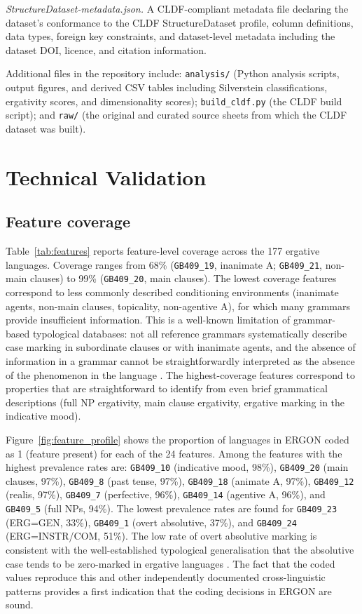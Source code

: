 \documentclass[12pt,a4paper]{article}
\newcommand{\feat}[1]{\texttt{#1}}
\begin{document}
\textit{StructureDataset-metadata.json.} A CLDF-compliant metadata file declaring the dataset's conformance to the CLDF StructureDataset profile, column definitions, data types, foreign key constraints, and dataset-level metadata including the dataset DOI, licence, and citation information.

Additional files in the repository include: \texttt{analysis/} (Python analysis scripts, output figures, and derived CSV tables including Silverstein classifications, ergativity scores, and dimensionality scores); \texttt{build\_cldf.py} (the CLDF build script); and \texttt{raw/} (the original and curated source sheets from which the CLDF dataset was built).

\section{Technical Validation}

\subsection{Feature coverage}

Table~\ref{tab:features} reports feature-level coverage across the 177 ergative languages. Coverage ranges from 68\% (\feat{GB409\_19}, inanimate A; \feat{GB409\_21}, non-main clauses) to 99\% (\feat{GB409\_20}, main clauses). The lowest coverage features correspond to less commonly described conditioning environments (inanimate agents, non-main clauses, topicality, non-agentive A), for which many grammars provide insufficient information. This is a well-known limitation of grammar-based typological databases: not all reference grammars systematically describe case marking in subordinate clauses or with inanimate agents, and the absence of information in a grammar cannot be straightforwardly interpreted as the absence of the phenomenon in the language \cite{grambank2023}. The highest-coverage features correspond to properties that are straightforward to identify from even brief grammatical descriptions (full NP ergativity, main clause ergativity, ergative marking in the indicative mood).

Figure~\ref{fig:feature_profile} shows the proportion of languages in ERGON coded as 1 (feature present) for each of the 24 features. Among the features with the highest prevalence rates are: \feat{GB409\_10} (indicative mood, 98\%), \feat{GB409\_20} (main clauses, 97\%), \feat{GB409\_8} (past tense, 97\%), \feat{GB409\_18} (animate A, 97\%), \feat{GB409\_12} (realis, 97\%), \feat{GB409\_7} (perfective, 96\%), \feat{GB409\_14} (agentive A, 96\%), and \feat{GB409\_5} (full NPs, 94\%). The lowest prevalence rates are found for \feat{GB409\_23} (ERG=GEN, 33\%), \feat{GB409\_1} (overt absolutive, 37\%), and \feat{GB409\_24} (ERG=INSTR/COM, 51\%). The low rate of overt absolutive marking is consistent with the well-established typological generalisation that the absolutive case tends to be zero-marked in ergative languages \cite{dixon1994,comrie1978}. The fact that the coded values reproduce this and other independently documented cross-linguistic patterns provides a first indication that the coding decisions in ERGON are sound.
\end{document}
